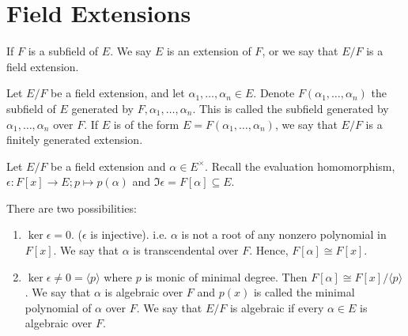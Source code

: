 \section{Field Extensions}

\begin{definition}
    If \(F\) is a subfield of \(E\). We say \(E\) is an extension of \(F\), or we say that \(E / F\) is a field extension.
\end{definition}

\begin{definition}
    Let \(E / F\) be a field extension, and let \(\alpha_1, \dots, \alpha_n \in E\). Denote \(F(\alpha_1, \dots, \alpha_n)\) the subfield of \(E\) generated by \(F, \alpha_1, \dots, \alpha_n\). This is called the subfield generated by \(\alpha_1, \dots, \alpha_n\) over \(F\). If \(E\) is of the form \(E = F(\alpha_1, \dots, \alpha_n)\), we say that \(E / F\) is a finitely generated extension.
\end{definition}


Let \(E / F\) be a field extension and \(\alpha \in E^\times\). Recall the evaluation homomorphism, \(\epsilon: F[x] \to E; p \mapsto p(\alpha)\) and \(\Im \epsilon = F[\alpha] \subseteq E\).

\begin{thrm-defn}
    There are two possibilities:
    \begin{enumerate}
        \item \(\ker \epsilon = 0\). (\(\epsilon\) is injective). i.e. \(\alpha\) is not a root of any nonzero polynomial in \(F[x]\). We say that \(\alpha\) is transcendental over \(F\). Hence, \(F[\alpha] \cong F[x]\).
        \item \(\ker \epsilon \neq 0 = \langle p \rangle\) where \(p\) is monic of minimal degree. Then \(F[\alpha] \cong F[x] / \langle p \rangle\). We say that \(\alpha\) is algebraic over \(F\) and \(p(x)\) is called the minimal polynomial of \(\alpha\) over \(F\). We say that \(E / F\) is algebraic if every \(\alpha \in E\) is algebraic over \(F\).
    \end{enumerate}
\end{thrm-defn}

